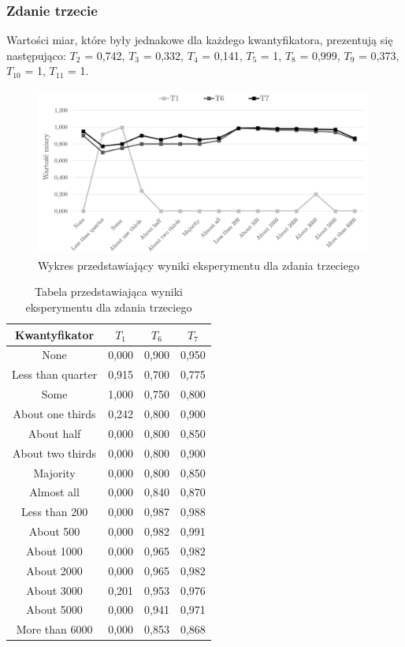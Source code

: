 \documentclass{classrep}
\begin{document}
\clearpage



\subsubsection{Zdanie trzecie}

Wartości miar, które były jednakowe dla każdego kwantyfikatora, prezentują się następująco:
$T_2$ = 0,742, $T_3$ = 0,332, $T_4$ = 0,141, $T_5$ = 1, $T_8$ = 0,999, $T_9$ = 0,373, $T_{10}$ = 1, $T_{11}$ = 1.

\begin{figure}[H]
	\centering
	\includegraphics[width=0.99\textwidth]{Pictures/ResultCharts/Eks1_3.png}
	\caption{Wykres przedstawiający wyniki eksperymentu dla zdania trzeciego}
\end{figure}

\begin{table}[H]
	\centering
	\begin{tabular}{c c c c} 
		\hline
		\textbf{Kwantyfikator}  & \textbf{$T_1$} & \textbf{$T_6$} & \textbf{$T_7$}\\ [0.5ex] 
		\hline
		\hline
None	&	0,000	&	0,900	&	0,950	\\
Less than quarter	&	0,915	&	0,700	&	0,775	\\
Some 	&	1,000	&	0,750	&	0,800	\\
About one thirds 	&	0,242	&	0,800	&	0,900	\\
About half 	&	0,000	&	0,800	&	0,850	\\
About two thirds 	&	0,000	&	0,800	&	0,900	\\
Majority 	&	0,000	&	0,800	&	0,850	\\
Almost all	&	0,000	&	0,840	&	0,870	\\
Less than 200	&	0,000	&	0,987	&	0,988	\\
About 500	&	0,000	&	0,982	&	0,991	\\
About 1000	&	0,000	&	0,965	&	0,982	\\
About 2000	&	0,000	&	0,965	&	0,982	\\
About 3000	&	0,201	&	0,953	&	0,976	\\
About 5000	&	0,000	&	0,941	&	0,971	\\
More than 6000	&	0,000	&	0,853	&	0,868	\\
		\hline
	\end{tabular}
	\caption{Tabela przedstawiająca wyniki eksperymentu dla zdania trzeciego}
\end{table}
\end{document}
